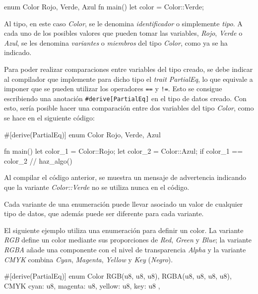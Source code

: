 \vspace{0.7em}
\begin{Codigo}
enum Color {
   Rojo,
   Verde,
   Azul
}
fn main() {
   let color = Color::Verde;
}
\end{Codigo}

Al tipo, en este caso \textit{Color}, se le denomina \textit{identificador} o simplemente \textit{tipo}. A cada uno de los posibles valores que pueden tomar las variables, \textit{Rojo}, \textit{Verde} o \textit{Azul}, se les denomina \textit{variantes} o \textit{miembros} del tipo \textit{Color}, como ya se ha indicado.

Para poder realizar comparaciones entre variables del tipo creado, se debe indicar al compilador que implemente para dicho tipo el \textit{trait PartialEq}, lo que equivale a imponer que se pueden utilizar los operadores \texttt{==} y \texttt{!=}. Esto se consigue escribiendo una anotación \texttt{\#derive[PartialEq]} en el tipo de datos creado. Con esto, sería posible hacer una comparación entre dos variables del tipo \textit{Color}, como se hace en el siguiente código:

\vspace{0.7em}
\begin{Codigo}
#[derive(PartialEq)]
enum Color {
   Rojo,
   Verde,
   Azul
}

fn main() {
   let color_1 = Color::Rojo;
   let color_2 = Color::Azul;  
   if color_1 == color_2 {
      // haz_algo()
   }
}
\end{Codigo} 

Al compilar el código anterior, se muestra un mensaje de advertencia indicando que la variante \textit{Color::Verde} no se utiliza nunca en el código. 

Cada variante de una enumeración puede llevar asociado un valor de cualquier tipo de datos, que además puede ser diferente para cada variante.

El siguiente ejemplo utiliza una enumeración para definir un color. La variante \textit{RGB} define un color mediante sus proporciones de \textit{Red}, \textit{Green} y \textit{Blue}; la variante \textit{RGBA} añade una componente con el nivel de transparencia \textit{Alpha} y la variante \textit{CMYK}  combina \textit{Cyan}, \textit{Magenta}, \textit{Yellow} y \textit{Key} (\textit{Negro}). 

\vspace{0.7em}
\begin{Codigo}
#[derive(PartialEq)]
enum Color {
   RGB(u8, u8, u8),
   RGBA(u8, u8, u8, u8),
   CMYK { cyan: u8, magenta: u8, yellow: u8, key: u8 },
}
\end{Codigo}

